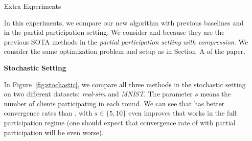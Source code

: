 \documentclass[12pt]{article}
\begin{document}
\begin{center}
    Extra Experiments
\end{center}

In this experiments, we compare our new algorithm  with previous baselines  and  in the partial participation setting. We consider  and  because they are the previous SOTA methods in the \emph{partial participation setting with compression}. We consider the same optimization problem and setup as in Section~A of the paper.

\begin{center}
    \bf Stochastic Setting
\end{center}

In Figure~\ref{fig:stochastic}, we compare all three methods in the stochastic setting on two different datasets: \textit{real-sim} and \textit{MNIST}. The parameter $s$ means the number of clients participating in each round. We can see that  has better convergence rates than .  with $s \in \{5, 10\}$ even improves  that works in the full participation regime (one should expect that convergence rate of  with partial participation will be even worse).
\end{document}
